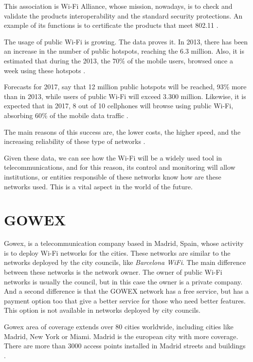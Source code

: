 \documentclass[12pt, a4paper,twoside]{tesi_upf}
\begin{document}
This association is Wi-Fi Alliance, whose mission, nowadays, is to check and validate the products interoperability and the standard security protections. An example of its functions is to certificate the products that meet 802.11 \cite{wifialliance}.

The usage of public Wi-Fi is growing. The data proves it. In 2013, there has been an increase in the number of public hotspots, reaching the 6.3 million. Also, it is estimated that during the 2013, the 70\% of the mobile users, browsed once a week using these hotspots \cite{informe2013}.

Forecasts for 2017, say that 12 million public hotspots will be reached, 93\% more than in 2013, while users of public Wi-Fi will exceed 3.300 million. Likewise, it is expected that in 2017, 8 out of 10 cellphones will browse using public Wi-Fi, absorbing 60\% of the mobile data traffic \cite{informe2013}. 

The main reasons of this success are, the lower costs, the higher speed, and the increasing reliability of these type of networks \cite{informe2013}.

Given these data, we can see how the Wi-Fi will be a widely used tool in telecommunications, and for this reason, its control and monitoring will allow institutions, or entities responsible of these networks know how are these networks used. This is a vital aspect in the world of the future.

\section{GOWEX}
Gowex, is a telecommunication company based in Madrid, Spain, whose activity is to deploy Wi-Fi networks for the cities. These networks are similar to the networks deployed by the city councils, like \emph{Barcelona WiFi}. The main difference between these networks is the network owner. The owner of public Wi-Fi networks is usually the council, but in this case the owner is a private company. And a second difference is that the GOWEX network has a free service, but has a payment option too that give a better service for those who need better features. This option is not available in networks deployed by city councils.

Gowex area of coverage extends over 80 cities worldwide, including cities like Madrid, New York or Miami. Madrid is the european city with more coverage. There are more than 3000 access points installed in Madrid streets and buildings \cite{gowex1}.
\end{document}
